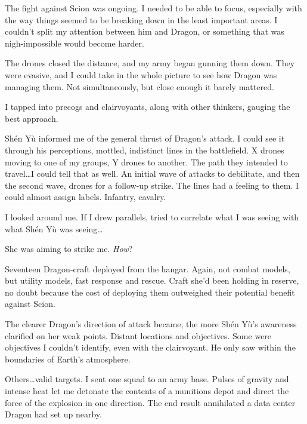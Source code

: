 The fight against Scion was ongoing.  I needed to be able to focus, especially with the way things seemed to be breaking down in the least important areas.  I couldn't split my attention between him and Dragon, or something that was nigh-impossible would become harder.



The drones closed the distance, and my army began gunning them down.  They were evasive, and I could take in the whole picture to see how Dragon was managing them.  Not simultaneously, but close enough it barely mattered.



I tapped into precogs and clairvoyants, along with other thinkers, gauging the best approach.



Sh\'{e}n Y\`{u} informed me of the general thrust of Dragon's attack.  I could see it through his perceptions, mottled, indistinct lines in the battlefield.  X drones moving to one of my groups, Y drones to another.  The path they intended to travel\ldots I could tell that as well.  An initial wave of attacks to debilitate, and then the second wave, drones for a follow-up strike.  The lines had a feeling to them.  I could almost assign labels.  Infantry, cavalry.



I looked around me.  If I drew parallels, tried to correlate what I was seeing with what Sh\'{e}n Y\`{u} was seeing\ldots



She was aiming to strike me.  \emph{How}?



Seventeen Dragon-craft deployed from the hangar.  Again, not combat models, but utility models, fast response and rescue.  Craft she'd been holding in reserve, no doubt because the cost of deploying them outweighed their potential benefit against Scion.



The clearer Dragon's direction of attack became, the more Sh\'{e}n Y\`{u}'s awareness clarified on her weak points.  Distant locations and objectives.  Some were objectives I couldn't identify, even with the clairvoyant.  He only saw within the boundaries of Earth's atmosphere.



Others\ldots valid targets.  I sent one squad to an army base.  Pulses of gravity and intense heat let me detonate the contents of a munitions depot and direct the force of the explosion in one direction.  The end result annihilated a data center Dragon had set up nearby.



